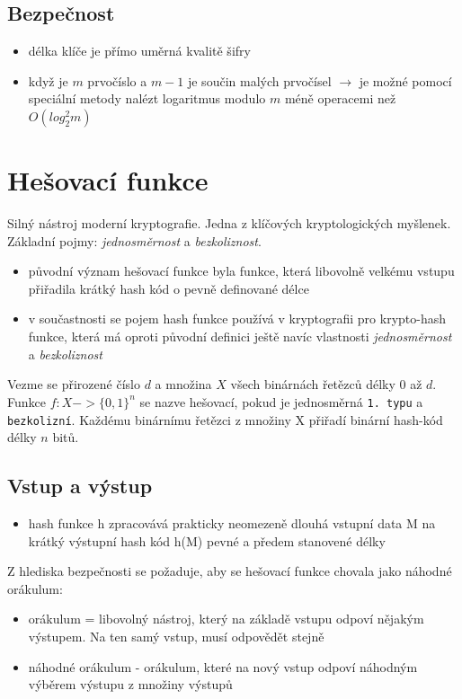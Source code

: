 \documentclass{szzclass}
\begin{document}
\subsection{Bezpečnost}
\begin{itemize}
    \item délka klíče je přímo uměrná kvalitě šifry
    \item když je $m$ prvočíslo a $m-1$ je součin malých prvočísel $\rightarrow$ je možné pomocí speciální metody nalézt logaritmus modulo $m$ méně operacemi než $O(log^2_2m)$
\end{itemize}
\section{Hešovací funkce}
Silný nástroj moderní kryptografie. Jedna z klíčových kryptologických myšlenek. Základní pojmy: \textit{jednosměrnost} a \textit{bezkoliznost}.
\newline
\begin{itemize}
    \item původní význam hešovací funkce byla funkce, která libovolně velkému vstupu přiřadila krátký hash kód o pevně definované délce
    \item v součastnosti se pojem hash funkce používá v kryptografii pro krypto-hash funkce, která má oproti původní definici ještě navíc vlastnosti \textit{jednosměrnost} a \textit{bezkoliznost}
\end{itemize}
Vezme se přirozené číslo $d$ a množina $X$ všech binárnách řetězců délky 0 až $d$. Funkce $f: X -> \{0, 1\}^n$ se nazve hešovací,
pokud je jednosměrná \texttt{1. typu} a \texttt{bezkolizní}. Každému binárnímu řetězci z množiny X přiřadí binární hash-kód délky $n$ bitů.
\subsection{Vstup a výstup}
\begin{itemize}
    \item hash funkce h zpracovává prakticky neomezeně dlouhá vstupní data M na krátký výstupní hash kód h(M) pevné a předem stanovené délky
\end{itemize}
Z hlediska bezpečnosti se požaduje, aby se hešovací funkce chovala jako náhodné orákulum:
\begin{itemize}
    \item orákulum = libovolný nástroj, který na základě vstupu odpoví nějakým výstupem. Na ten samý vstup, musí odpovědět stejně
    \item náhodné orákulum - orákulum, které na nový vstup odpoví náhodným výběrem výstupu z množiny výstupů
\end{itemize}
\end{document}
